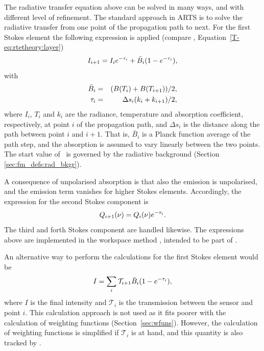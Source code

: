 The radiative transfer equation above can be solved in many ways, and with
different level of refinement. The standard approach in ARTS is to solve the
radiative transfer from one point of the propagation path to next. For the
first Stokes element the following expression is applied (compare \theory,
Equation~\ref{T-eq:rtetheory:layer})
\begin{equation}
  \label{eq:fm_defs:rte_step}
  I_{i+1} = I_ie^{-\tau_{i}} + \bar{B}_i(1-e^{-\tau_{i}}),
\end{equation}
with
\begin{eqnarray}
  \bar{B}_i &=& (B(T_i)+B(T_{i+1}))/2, \\
  \tau_{i} &=& \Delta s_i(k_i+k_{i+1})/2,  
  \label{eq:taustep}
\end{eqnarray}
where $I_i$, $T_i$ and $k_i$ are the radiance, temperature and absorption
coefficient, respectively, at point $i$ of the propagation path, and $\Delta
s_i$ is the distance along the path between point $i$ and $i+1$. That is,
$\bar{B}_i$ is a Planck function average of the path step, and the absorption
is assumed to vary linearly between the two points. The start value of \Mpi\ is
governed by the radiative background (Section \ref{sec:fm_defs:rad_bkgr}).

A consequence of unpolarised absorption is that also the emission is
unpolarised, and the emission term vanishes for higher Stokes elements.
Accordingly, the expression for the second Stokes component is
\begin{equation}
  Q_{i+1}(\nu) = Q_i(\nu)e^{-\tau_{i}}.
  \label{eq:fm_defs:rte_step2}
\end{equation}
The third and forth Stokes component are handled likewise. The expressions
above are implemented in the workspace method ,
intended to be part of .

An alternative way to perform the calculations for the first Stokes element
would be
\begin{equation}
  \label{eq:fm_defs:rte_alt}
  I = \sum_i \mathcal{T}_{i+1} \bar{B}_i(1-e^{-\tau_{i}}),
\end{equation}
where $I$ is the final intensity and $\mathcal{T}_i$ is the transmission
between the sensor and point $i$. This calculation approach is not used as it
fits poorer with the calculation of weighting functions
(Section~\ref{sec:wfuns}). However, the calculation of weighting functions is
simplified if $\mathcal{T}_i$ is at hand, and this quantity is also tracked by
. 


